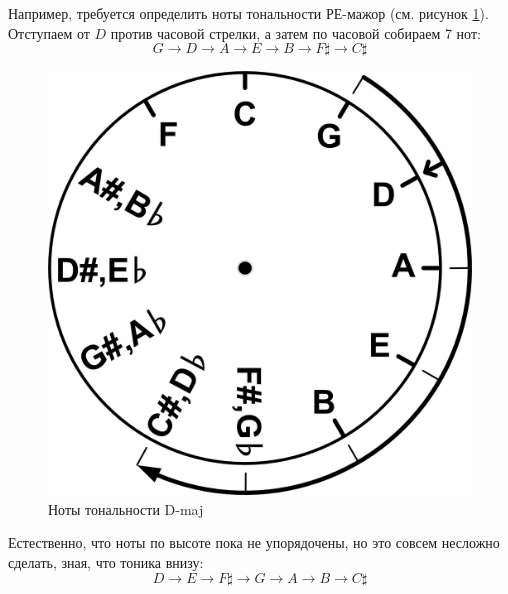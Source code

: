 Например, требуется определить ноты тональности РЕ-мажор (см. рисунок \ref{fig:harmony:kvinto-kvarto:d-maj}). Отступаем от $D$ против часовой стрелки, а затем по часовой собираем 7 нот:
\[
    G\rightarrow 
    D\rightarrow 
    A\rightarrow 
    E\rightarrow 
    B\rightarrow 
    {F\sharp}\rightarrow
    {C\sharp}
\]

\begin{figure}[!ht]
    \centering
    \includegraphics[scale=0.5]{fig/kvinto-kvarto/kvinto-kvarto-d-maj} 
    \caption{Ноты тональности D-maj}\label{fig:harmony:kvinto-kvarto:d-maj}
\end{figure} 

Естественно, что ноты по высоте пока не упорядочены, но это совсем несложно сделать, зная, что тоника внизу:
\[
    D\rightarrow 
    E\rightarrow 
    {F\sharp}\rightarrow
    G\rightarrow 
    A\rightarrow 
    B\rightarrow 
    {C\sharp}
\]
